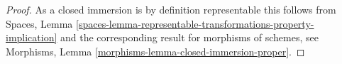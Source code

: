 \documentclass[10pt,a4paper]{amsart}
\theoremstyle{plain}
\theoremstyle{definition}
\theoremstyle{remark}
\numberwithin{equation}{subsection}
\begin{document}
\begin{proof}
As a closed immersion is by definition representable this follows from
Spaces,
Lemma \ref{spaces-lemma-representable-transformations-property-implication}
and the corresponding result for morphisms of schemes, see
Morphisms, Lemma \ref{morphisms-lemma-closed-immersion-proper}.
\end{proof}
\end{document}
